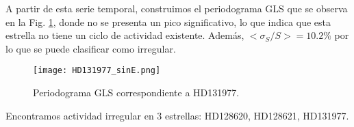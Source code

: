 \documentclass[baaa]{baaa}
\begin{document}
A partir de esta serie temporal, construimos el periodograma GLS que se observa en la Fig. \ref{hd131977P}, donde no se presenta un pico significativo, lo que indica que esta estrella no tiene un ciclo de actividad existente. Además, $<\sigma_S/S>=10.2\%$ por lo que se puede clasificar como irregular.

\begin{figure}[ht!]
\centering
\texttt{[image: HD131977\_sinE.png]}
\caption{Periodograma GLS correspondiente a HD131977.}
\label{hd131977P}
\end{figure}

Encontramos actividad irregular en 3 estrellas: HD128620, HD128621, HD131977. 

\end{document}
